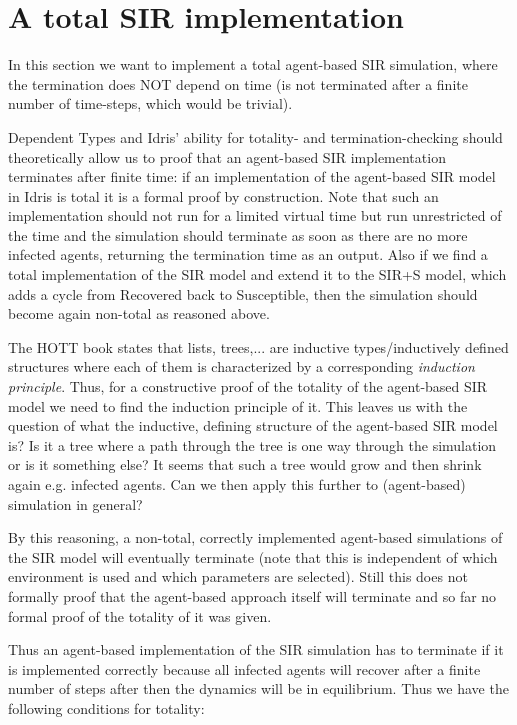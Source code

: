 \section{A total SIR implementation}
In this section we want to implement a total agent-based SIR simulation, where the termination does NOT depend on time (is not terminated after a finite number of time-steps, which would be trivial).

Dependent Types and Idris' ability for totality- and termination-checking should theoretically allow us to proof that an agent-based SIR implementation terminates after finite time: if an implementation of the agent-based SIR model in Idris is total it is a formal proof by construction. Note that such an implementation should not run for a limited virtual time but run unrestricted of the time and the simulation should terminate as soon as there are no more infected agents, returning the termination time as an output. Also if we find a total implementation of the SIR model and extend it to the SIR+S model, which adds a cycle from Recovered back to Susceptible, then the simulation should become again non-total as reasoned above.

The HOTT book \cite{program_homotopy_2013} states that lists, trees,... are inductive types/inductively defined structures where each of them is characterized by a corresponding \textit{induction principle}. Thus, for a constructive proof of the totality of the agent-based SIR model we need to find the induction principle of it. This leaves us with the question of what the inductive, defining structure of the agent-based SIR model is? Is it a tree where a path through the tree is one way through the simulation or is it something else? It seems that such a tree would grow and then shrink again e.g. infected agents. Can we then apply this further to (agent-based) simulation in general?

By this reasoning, a non-total, correctly implemented agent-based simulations of the SIR model will eventually terminate (note that this is independent of which environment is used and which parameters are selected). Still this does not formally proof that the agent-based approach itself will terminate and so far no formal proof of the totality of it was given.

Thus an agent-based implementation of the SIR simulation has to terminate if it is implemented correctly because all infected agents will recover after a finite number of steps after then the dynamics will be in equilibrium. Thus we have the following conditions for totality:

